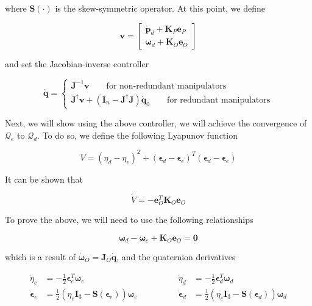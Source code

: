 \documentclass[10pt]{article}
\begin{document}
where  $\boldsymbol{S}(\cdot)$ is the skew-symmetric operator.  At this point, we define 


$$
\boldsymbol{v}=\left[\begin{array}{l}
\dot{\boldsymbol{p}}_{d}+\boldsymbol{K}_{P} \boldsymbol{e}_{P} \\
\boldsymbol{\omega}_{d}+\boldsymbol{K}_{O} \boldsymbol{e}_{O}
\end{array}\right]
$$


and set the Jacobian-inverse controller 





$$
\dot{\boldsymbol{q}}=
\begin{cases}
\boldsymbol{J}^{-1} \boldsymbol{v}  \quad\quad\text{for non-redundant manipulators} \\
\boldsymbol{J}^{\dagger}\boldsymbol{v}+\left(\boldsymbol{I}_{n}-\boldsymbol{J}^{\dagger} \boldsymbol{J}\right) \dot{\boldsymbol{q}}_{0} \quad\quad\text{for redundant manipulators}
\end{cases}
$$



Next, we will show   using the above controller, we will  achieve the convergence of $\mathcal{Q}_{e}$ to $\mathcal{Q}_{d}$. To do so, we define the following Lyapunov function 

$$
V=\left(\eta_{d}-\eta_{e}\right)^{2}+\left(\boldsymbol{\epsilon}_{d}-\boldsymbol{\epsilon}_{e}\right)^{T}\left(\boldsymbol{\epsilon}_{d}-\boldsymbol{\epsilon}_{e}\right)
$$

It can be shown that 

$$
\dot{V}=-\boldsymbol{e}_{O}^{T} \boldsymbol{K}_{O} \boldsymbol{e}_{O}
$$

To prove the above, we will need to use the following relationships

$$
\boldsymbol\omega_{d}-\boldsymbol\omega_{e}+\boldsymbol{K}_{O} \boldsymbol{e}_{O}=\mathbf{0}
$$

which is a result of $\dot{\boldsymbol{\omega}}_{O}=\boldsymbol{J}_{O}\dot{\boldsymbol{q}}$, and the quaternion derivatives


$$
\begin{aligned}
\dot{\eta}_{e} & =-\frac{1}{2} \boldsymbol{\epsilon}_{e}^{T} \boldsymbol{\omega}_{e} \\
\dot{\boldsymbol{\epsilon}}_{e} & =\frac{1}{2}\left(\eta_{e} \boldsymbol{I}_{3}-\boldsymbol{S}\left(\boldsymbol{\epsilon}_{e}\right)\right) \boldsymbol{\omega}_{e}
\end{aligned} \qquad\qquad
\begin{aligned}
\dot{\eta}_{d} & =-\frac{1}{2} \boldsymbol{\epsilon}_{d}^{T} \boldsymbol{\omega}_{d} \\
\dot{\boldsymbol{\epsilon}}_{d} & =\frac{1}{2}\left(\eta_{e} \boldsymbol{I}_{3}-\boldsymbol{S}\left(\boldsymbol{\epsilon}_{d}\right)\right) \boldsymbol{\omega}_{d}
\end{aligned}
$$
\end{document}
